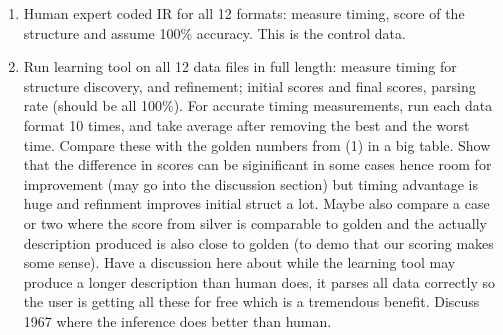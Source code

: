 \begin{enumerate}
\item Human expert coded IR for all 12 formats: measure timing, score of the structure and assume 100\% 
accuracy. This is the control data.

\item Run learning tool on all 12 data files in full length: measure timing for structure discovery, 
and refinement; initial scores and final scores, parsing rate (should be all 100\%).
For accurate timing measurements, run each data format 10 times, and take average after removing the
best and the worst time.
Compare these with the golden numbers from (1) in a big table. Show that the difference in scores
can be siginificant in some cases hence room for improvement (may go into the discussion section)
but timing advantage is huge and refinment improves initial struct a lot. Maybe also compare a case or
two where the score from silver is comparable to golden and the actually description produced is also
close to golden (to demo that our scoring makes some sense).
Have a discussion here about while the learning tool may produce a longer description than human does,
it parses all data correctly so the user is getting all these for free which is a tremendous benefit.
Discuss 1967 where the inference does better than human.


\end{enumerate}
